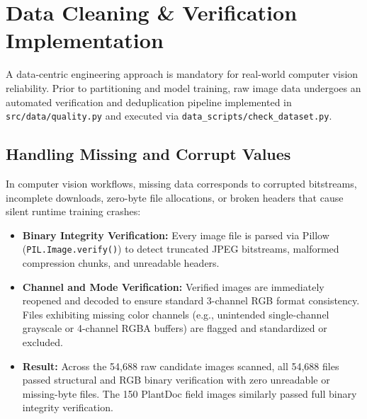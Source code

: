 \section{Data Cleaning \& Verification Implementation}
\label{sec:cleaning}

A data-centric engineering approach is mandatory for real-world computer vision reliability. Prior to partitioning and model training, raw image data undergoes an automated verification and deduplication pipeline implemented in \texttt{src/data/quality.py} and executed via \texttt{data\_scripts/check\_dataset.py}.

\subsection{Handling Missing and Corrupt Values}
In computer vision workflows, missing data corresponds to corrupted bitstreams, incomplete downloads, zero-byte file allocations, or broken headers that cause silent runtime training crashes:
\begin{itemize}
    \item \textbf{Binary Integrity Verification:} Every image file is parsed via Pillow (\texttt{PIL.Image.verify()}) to detect truncated JPEG bitstreams, malformed compression chunks, and unreadable headers.
    \item \textbf{Channel and Mode Verification:} Verified images are immediately reopened and decoded to ensure standard 3-channel RGB format consistency. Files exhibiting missing color channels (e.g., unintended single-channel grayscale or 4-channel RGBA buffers) are flagged and standardized or excluded.
    \item \textbf{Result:} Across the 54,688 raw candidate images scanned, all 54,688 files passed structural and RGB binary verification with zero unreadable or missing-byte files. The 150 PlantDoc field images similarly passed full binary integrity verification.
\end{itemize}

